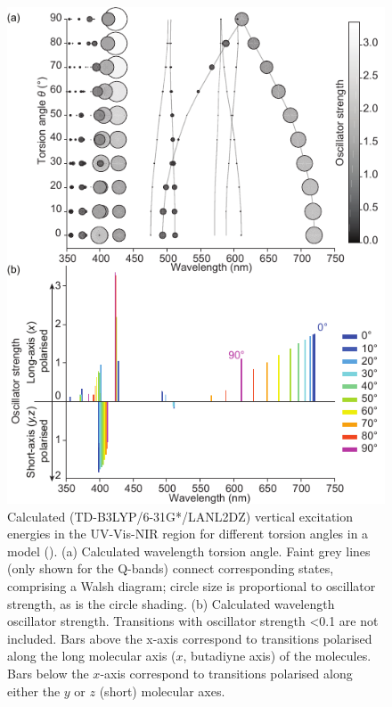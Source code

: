 		\begin{figure}[ht!]
			\centering\includegraphics{figures/dimer/Figure-4.pdf} 
			\caption[]{Calculated (TD-B3LYP/6-31G*/LANL2DZ) vertical excitation energies in the UV-Vis-NIR region for different torsion angles in a model  (). (a) Calculated wavelength  torsion angle. Faint grey lines (only shown for the Q-bands) connect corresponding states, comprising a Walsh diagram; circle size is proportional to oscillator strength, as is the circle shading. (b) Calculated wavelength  oscillator strength. Transitions with oscillator strength \textless 0.1 are not included. Bars above the x-axis correspond to transitions polarised along the long molecular axis ($x$, butadiyne axis) of the molecules. Bars below the $x$-axis correspond to transitions polarised along either the $y$ or $z$ (short) molecular axes.}
			\label{fig:dimer:f4}
		\end{figure}

